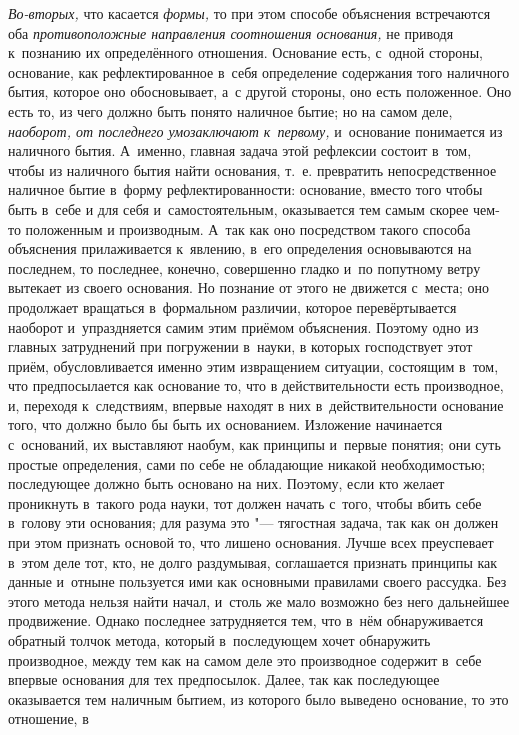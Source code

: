 {\em Во-вторых,} что касается {\em формы,} то при этом способе объяснения
встречаются оба {\em противоположные направления соотношения основания,} не
приводя к~познанию их определённого отношения. Основание есть, с~одной стороны,
основание, как рефлектированное в~себя определение содержания того наличного
бытия, которое оно обосновывает, а~с другой стороны, оно есть положенное. Оно
есть то, из чего должно быть понято наличное бытие; но на самом деле,
{\em наоборот, от последнего умозаключают к~первому,} и~основание понимается из
наличного бытия. А~именно, главная задача этой рефлексии состоит в~том, чтобы
из наличного бытия найти основания, т.~е. превратить непосредственное наличное
бытие в~форму рефлектированности: основание, вместо того чтобы быть в~себе и
для себя и~самостоятельным, оказывается тем самым скорее чем-то положенным и
производным. А~так как оно посредством такого способа объяснения прилаживается
к~явлению, в~его определения основываются на последнем, то последнее, конечно,
совершенно гладко и~по попутному ветру вытекает из своего основания. Но
познание от этого не движется с~места; оно продолжает вращаться в~формальном
различии, которое перевёртывается наоборот и~упраздняется самим этим приёмом
объяснения. Поэтому одно из главных затруднений при погружении в~науки, в
которых господствует этот приём, обусловливается именно этим извращением
ситуации, состоящим в~том, что предпосылается как основание то, что в
действительности есть производное, и, переходя к~следствиям, впервые находят в
них в~действительности основание того, что должно было бы быть их основанием.
Изложение начинается с~оснований, их выставляют наобум, как принципы и~первые
понятия; они суть простые определения, сами по себе не обладающие никакой
необходимостью; последующее должно быть основано на них. Поэтому, если кто
желает проникнуть в~такого рода науки, тот должен начать с~того, чтобы вбить
себе в~голову эти основания; для разума это "--- тягостная задача, так как он
должен при этом признать основой то, что лишено основания. Лучше всех
преуспевает в~этом деле тот, кто, не долго раздумывая, соглашается признать
принципы как данные и~отныне пользуется ими как основными правилами своего
рассудка. Без этого метода нельзя найти начал, и~столь же мало возможно без
него дальнейшее продвижение. Однако последнее затрудняется тем, что в~нём
обнаруживается обратный толчок метода, который в~последующем хочет обнаружить
производное, между тем как на самом деле это производное содержит в~себе
впервые основания для тех предпосылок. Далее, так как последующее оказывается
тем наличным бытием, из которого было выведено основание, то это отношение, в

